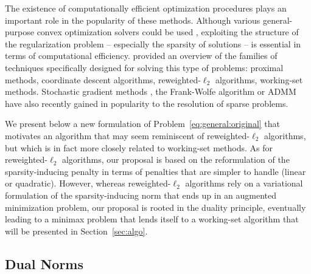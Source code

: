 The existence of computationally efficient optimization procedures plays an
important role in the popularity of these methods.
Although various general-purpose convex optimization solvers could be used
\citep{boyd2004convex}, exploiting the structure of the regularization problem -- 
 especially the sparsity of solutions -- is essential in terms of computational
efficiency.
%
\citet{2012_FML_Bach} provided an overview of the families of techniques 
specifically  designed for solving this type of problems:
proximal methods, coordinate descent algorithms, reweighted-$\ell_{2}$
algorithms, working-set methods.
Stochastic gradient methods \citep{moulines2011non}, the
Frank-Wolfe algorithm \citep{lacoste2012block} or ADMM \citep[Alternating Direction
Method of Multipliers,][]{boyd2011distributed} have also recently gained in
popularity to the resolution of sparse problems.

We present below a new formulation of
Problem~\eqref{eq:general:original} that motivates an algorithm that
may seem reminiscent of reweighted-$\ell_{2}$ algorithms, but which is
in fact more closely related to working-set methods.
%
As for reweighted-$\ell_{2}$ algorithms, our proposal is based on the
reformulation of the sparsity-inducing penalty in terms of penalties
that are simpler to handle (linear or quadratic).  However, whereas
reweighted-$\ell_{2}$ algorithms rely on a variational formulation of
the sparsity-inducing norm that ends up in an augmented minimization
problem, our proposal is rooted in the duality principle, eventually
leading to a minimax problem that lends itself to a working-set
algorithm that will be presented in Section~\ref{sec:algo}.

\subsection{Dual Norms}

